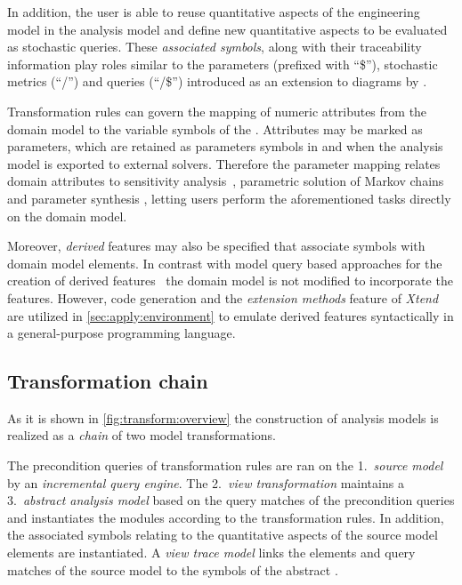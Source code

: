 In addition, the user is able to reuse quantitative aspects of the engineering model in the analysis model and define new quantitative aspects to be evaluated as stochastic queries. These \emph{associated symbols}, along with their traceability information play roles similar to the parameters (prefixed with \enquote{\$}), stochastic metrics (\enquote{/}) and queries (\enquote{/\$}) introduced as an extension to  diagrams by \citet{Bernardi03building}.

Transformation rules can govern the mapping of numeric attributes from the domain model to the variable symbols of the . Attributes may be marked as parameters, which are retained as parameters symbols in  and when the analysis model is exported to external solvers. Therefore the parameter mapping relates domain attributes to sensitivity analysis~\citep{Blake88sensitivity}, parametric solution of Markov chains~\citep{Hahn11parametric} and parameter synthesis \citep{Quatmann16mdp,Molnar17optimization}, letting users perform the aforementioned tasks directly on the domain model.

Moreover, \emph{derived} features may also be specified that associate  symbols with domain model elements. In contrast with model query based approaches for the creation of derived features~\citep{Rath12derived} the domain model is not modified to incorporate the features. However, code generation and the \emph{extension methods} feature of \emph{Xtend} are utilized in \vref{sec:apply:environment} to emulate derived features syntactically in a general-purpose programming language.

\subsection{Transformation chain}

As it is shown in \vref{fig:transform:overview} the construction of  analysis models is realized as a \emph{chain} of two model transformations.

The precondition queries of transformation rules are ran on the 1.~\emph{source model} by an \emph{incremental query engine}. The 2.~\emph{view transformation} maintains a 3.~\emph{abstract analysis model} based on the query matches of the precondition queries and instantiates the  modules according to the transformation rules. In addition, the associated symbols relating to the quantitative aspects of the source model elements are instantiated. A \emph{view trace model} links the elements and query matches of the source model to the symbols of the abstract .


